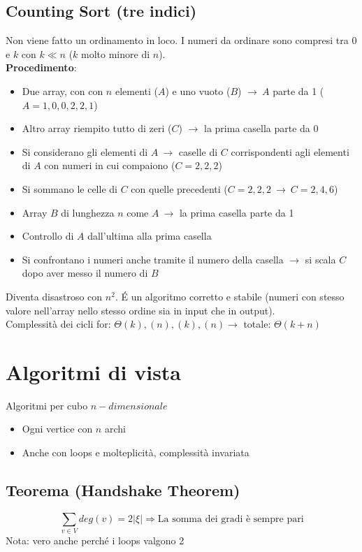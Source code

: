 \documentclass[12pt,a4paper]{article}
\begin{document}
\subsection{Counting Sort (tre indici)}
Non viene fatto un ordinamento in loco. I numeri da ordinare sono compresi tra 0 e $k$ con $k\ll n$ ($k$ molto minore di $n$).\\
\textbf{Procedimento}:
\begin{itemize}
\item Due array, con con $n$ elementi ($A$) e uno vuoto ($B$) $\rightarrow \ A$ parte da 1 ($A=1,0,0,2,2,1$)
\item Altro array riempito tutto di zeri ($C$) $\rightarrow$ la prima casella parte da $0$
\item Si considerano gli elementi di $A \ \rightarrow$ caselle di $C$ corrispondenti agli elementi di $A$ con numeri in cui compaiono ($C = 2, 2, 2$)
\item Si sommano le celle di $C$ con quelle precedenti ($C=2,2,2\ \rightarrow \ C=2,4,6$)
\item Array $B$ di lunghezza $n$ come $A\ \rightarrow$ la prima casella parte da 1
\item Controllo di $A$ dall'ultima alla prima casella
\item Si confrontano i numeri anche tramite il numero della casella $\rightarrow$ si scala $C$ dopo aver messo il numero di $B$
\end{itemize} 
Diventa disastroso con $n^2$. \'E un algoritmo corretto e stabile (numeri con stesso valore nell’array nello stesso ordine sia in input che in output).\\
Complessità dei cicli for: $\Theta(k), (n), (k), (n) \rightarrow$ totale: $\Theta(k+n)$

\clearpage
\section{Algoritmi di vista}
Algoritmi per cubo $n-dimensionale$
\begin{itemize}
\item Ogni vertice con $n$ archi
\item Anche con loops e molteplicità, complessità invariata
\end{itemize}

\subsection{Teorema (Handshake Theorem)}
$$\sum_{v \in V} deg(v) = 2|\xi| \Rightarrow \text{La somma dei gradi è sempre pari}$$
Nota: vero anche perché i loops valgono 2
\end{document}
